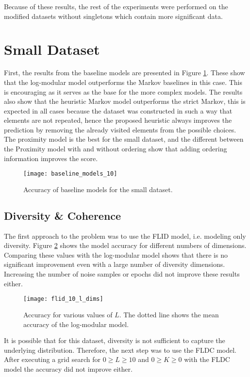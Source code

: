 Because of these results, the rest of the experiments were performed on the modified datasets without singletons which contain more significant data.

\section{Small Dataset}

First, the results from the baseline models are presented in Figure \ref{fig:small_baselines}. These show that the log-modular model outperforms the Markov baselines in this case. This is encouraging as it serves as the base for the more complex models. The results also show that the heuristic Markov model outperforms the strict Markov, this is expected in all cases because the dataset was constructed in such a way that elements are not repeated, hence the proposed heuristic always improves the prediction by removing the already visited elements from the possible choices. The proximity model is the best for the small dataset, and the different between the Proximity model with and without ordering show that adding ordering information improves the score.

\begin{figure}
  \centering
  \texttt{[image: baseline\_models\_10]}
  \caption{Accuracy of baseline models for the small dataset.}
  \label{fig:small_baselines}
\end{figure}

\subsection{Diversity \& Coherence}

The first approach to the problem was to use the FLID model, i.e. modeling only diversity. Figure \ref{fig:flid_small_l_dims} shows the model accuracy for different numbers of dimensions. Comparing these values with the log-modular model shows that there is no significant improvement even with a large number of diversity dimensions. Increasing the number of noise samples or epochs did not improve these results either.

\begin{figure}
  \centering
  \texttt{[image: flid\_10\_l\_dims]}
  \caption{Accuracy for various values of $L$. The dotted line shows the mean accuracy of the log-modular model.}
  \label{fig:flid_small_l_dims}
\end{figure}

It is possible that for this dataset, diversity is not sufficient to capture the underlying distribution. Therefore, the next step was to use the FLDC model. After executing a grid search for $0 \geq L \geq 10$ and $0 \geq K \geq 0$ with the FLDC model the accuracy did not improve either.

